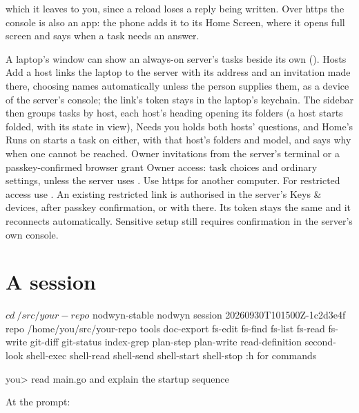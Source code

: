 \begin{description}[leftmargin=2.2em]
  which it leaves to you, since a reload loses a reply being written.
  Over https the console is also an app: the phone adds it to its Home
  Screen, where it opens full screen and says when a task needs an answer.
\item[Several hosts] A laptop's window can show an always-on server's
  tasks beside its own (). Hosts \textrightarrow{} Add a host links
  the laptop to the server with its address and an invitation made there,
  choosing names automatically unless the person supplies them, as a device of
  the server's console; the link's token stays in the laptop's keychain.
  The sidebar then groups tasks by host, each host's heading opening its
  folders (a host starts folded, with its state in view), Needs you holds both hosts'
  questions, and Home's Runs on starts a task on either, with that host's
  folders and model, and says why when one cannot be reached. Owner invitations from the server's terminal or a passkey-confirmed browser
  grant Owner access: task choices and ordinary settings, unless the server
  uses . Use https for another computer. For restricted
  access use . An existing restricted
  link is authorised in the server's Keys \& devices, after passkey confirmation,
  or with  there. Its token stays the same
  and it reconnects automatically. Sensitive setup still requires confirmation
  in the server's own console.
\end{description}

\chapter{A session}

\begin{sh}
$ cd ~/src/your-repo
$ nodwyn-stable
nodwyn session 20260930T101500Z-1c2d3e4f
repo  /home/you/src/your-repo
tools doc-export fs-edit fs-find fs-list fs-read fs-write git-diff git-status
      index-grep plan-step plan-write read-definition second-look shell-exec
      shell-read shell-send shell-start shell-stop
:h for commands

you> read main.go and explain the startup sequence
\end{sh}

At the prompt:

